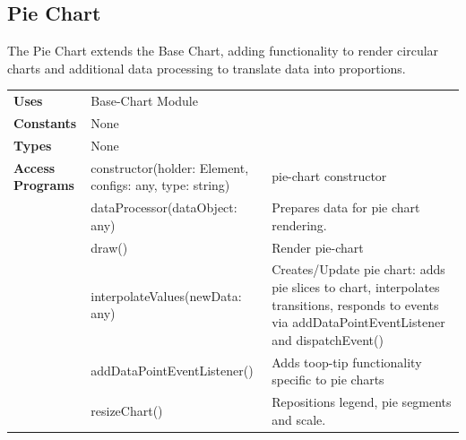 \documentclass[12pt, titlepage]{article}
\begin{document}
\newpage
\subsection{Pie Chart}
The Pie Chart extends the Base Chart, adding functionality to render circular charts and additional data processing to translate data into proportions. 

\begin{table}[H]
\begin{tabular}{l p{5cm}p{5cm}}
\textbf{Uses}            & Base-Chart Module                     &                                                                                                                  \\
\textbf{Constants}       & None                             &                                                                                                     \\
                         
\textbf{Types}           & None                                       &                                                                                                                  \\
\textbf{Access Programs} & constructor(holder: Element, configs: any, type: string) & pie-chart constructor                                                                                            \\
                         & dataProcessor(dataObject: any)             & Prepares data for pie chart rendering. \\
                         & draw()                                     & Render pie-chart                                                                                                 \\
                         & interpolateValues(newData: any)            & Creates/Update pie chart: adds pie slices to chart, interpolates transitions, responds to events via addDataPointEventListener and dispatchEvent() \\
                         & addDataPointEventListener()                & Adds toop-tip functionality specific to pie charts                                                               \\
                         & resizeChart()                              & Repositions legend, pie segments and scale.\\  
\end{tabular}
\end{table}
\end{document}
